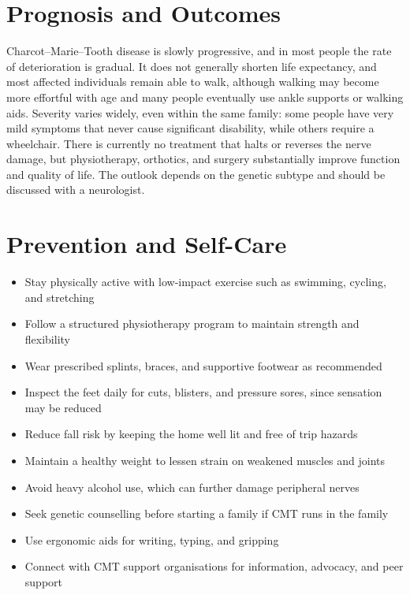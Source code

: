 \section*{Prognosis and Outcomes}
Charcot--Marie--Tooth disease is slowly progressive, and in most people the rate of deterioration is gradual. It does not generally shorten life expectancy, and most affected individuals remain able to walk, although walking may become more effortful with age and many people eventually use ankle supports or walking aids. Severity varies widely, even within the same family: some people have very mild symptoms that never cause significant disability, while others require a wheelchair. There is currently no treatment that halts or reverses the nerve damage, but physiotherapy, orthotics, and surgery substantially improve function and quality of life. The outlook depends on the genetic subtype and should be discussed with a neurologist.

\section*{Prevention and Self-Care}
\begin{itemize}
    \item Stay physically active with low-impact exercise such as swimming, cycling, and stretching
    \item Follow a structured physiotherapy program to maintain strength and flexibility
    \item Wear prescribed splints, braces, and supportive footwear as recommended
    \item Inspect the feet daily for cuts, blisters, and pressure sores, since sensation may be reduced
    \item Reduce fall risk by keeping the home well lit and free of trip hazards
    \item Maintain a healthy weight to lessen strain on weakened muscles and joints
    \item Avoid heavy alcohol use, which can further damage peripheral nerves
    \item Seek genetic counselling before starting a family if CMT runs in the family
    \item Use ergonomic aids for writing, typing, and gripping
    \item Connect with CMT support organisations for information, advocacy, and peer support
\end{itemize}

